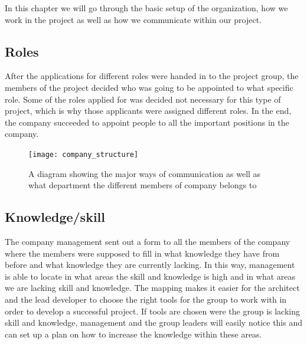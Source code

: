 In this chapter we will go through the basic setup of the organization, how we work in the project as well as how we communicate within our project. 

\subsection{Roles}
After the applications for different roles were handed in to the project group, the members of the project decided who was going to be appointed to what specific role. Some of the roles applied for was decided not necessary for this type of project, which is why those applicants were assigned different roles. In the end, the company succeeded to appoint people to all the important positions in the company. 

\begin{figure}[hbt!]
\centering
\texttt{[image: company\_structure]}
\caption{A diagram showing the major ways of communication as well as what department the different members of company belongs to}
\label{fig:company structure}
\end{figure}



\subsection{Knowledge/skill}
The company management sent out a form to all the members of the company where the members were supposed to fill in what knowledge they have from before and what knowledge they are currently lacking. In this way, management is able to locate in what areas the skill and knowledge is high and in what areas we are lacking skill and knowledge. The mapping makes it easier for the architect and the lead developer to choose the right tools for the group to work with in order to develop a successful project. If tools are chosen were the group is lacking skill and knowledge, management and the group leaders will easily notice this and can set up a plan on how to increase the knowledge within these areas. 


